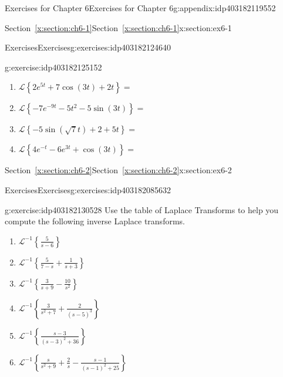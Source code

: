 \documentclass[oneside,10pt,]{book}
\newcommand{\xreffont}{\relax}
\numberwithin{equation}{section}
\numberwithin{equation}{section}
\begin{document}
\begin{appendixptx}{Exercises for Chapter 6}{}{Exercises for Chapter 6}{}{}{g:appendix:idp403182119552}
\begin{sectionptx}{Section~{\xreffont\ref*{x:section:ch6-1}}}{}{Section~{\xreffont\ref*{x:section:ch6-1}}}{}{}{x:section:ex6-1}
\begin{exercises-subsection-numberless}{Exercises}{}{Exercises}{}{}{g:exercises:idp403182124640}
\begin{divisionexercise}{4}{}{}{g:exercise:idp403182125152}
%
\begin{enumerate}[label=(\alph*)]
\item{}\(\displaystyle \mathcal{L}\left\{ 2e^{5t}+7\cos(3t)+2t\right\} =\)%
\item{}\(\displaystyle \mathcal{L}\left\{ -7e^{-9t}-5t^{2}-5\sin(3t)\right\} =\)%
\item{}\(\displaystyle \mathcal{L}\left\{ -5\sin(\sqrt{7}t)+2+5t\right\} =\)%
\item{}\(\displaystyle \mathcal{L}\left\{ 4e^{-t}-6e^{3t}+\cos(3t)\right\} =\)%
\end{enumerate}
\end{divisionexercise}%
\end{exercises-subsection-numberless}
\end{sectionptx}
%
%
\typeout{************************************************}
\typeout{Section F.2 Section~{\xreffont\ref*{x:section:ch6-2}}}
\typeout{************************************************}
%
\begin{sectionptx}{Section~{\xreffont\ref*{x:section:ch6-2}}}{}{Section~{\xreffont\ref*{x:section:ch6-2}}}{}{}{x:section:ex6-2}
%
%
\typeout{************************************************}
\typeout{************************************************}
%
\begin{exercises-subsection-numberless}{Exercises}{}{Exercises}{}{}{g:exercises:idp403182085632}
\begin{divisionexercise}{1}{}{}{g:exercise:idp403182130528}%
Use the table of Laplace Transforms to help you compute the following inverse Laplace transforms.%
%
\begin{enumerate}[label=(\alph*)]
\item{}\(\displaystyle \mathcal{L}^{-1}\left\{ \frac{5}{s-6}\right\}\)%
\item{}\(\displaystyle \mathcal{L}^{-1}\left\{ \frac{5}{7-s}+\frac{1}{s+3}\right\} \)%
\item{}\(\displaystyle \mathcal{L}^{-1}\left\{ \frac{3}{s+9}-\frac{10}{s^{2}}\right\} \)%
\item{}\(\displaystyle \mathcal{L}^{-1}\left\{ \frac{3}{s^{2}+7}+\frac{2}{\left(s-5\right)^{3}}\right\} \)%
\item{}\(\displaystyle \mathcal{L}^{-1}\left\{ \frac{s-3}{\left(s-3\right)^{2}+36}\right\} \)%
\item{}\(\displaystyle \mathcal{L}^{-1}\left\{ \frac{s}{s^{2}+9}+\frac{2}{s}-\frac{s-1}{\left(s-1\right)^{2}+25}\right\} \)%
\end{enumerate}

\end{divisionexercise}
\end{exercises-subsection-numberless}
\end{sectionptx}
\end{appendixptx}
\end{document}
